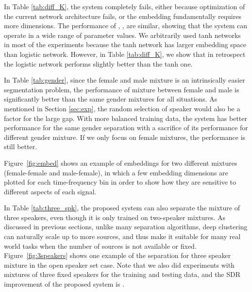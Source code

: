 \documentclass[9pt]{article} \usepackage{nips15submit_e,times}
\begin{document}
In Table \ref{tab:diff_K}, the  system completely fails, either because optimization of the current network architecture fails, or the embedding fundamentally requires more dimensions. The performance of , ,  are similar, showing that the system can operate in a wide range of parameter values.  
We arbitrarily used tanh networks in most of the experiments because the tanh network has larger embedding space than logistic network. However, in Table \ref{tab:diff_K}, we show that in retrospect the logistic network performs slightly better than the tanh one.  

In Table \ref{tab:gender}, since the female and male mixture is an intrinsically easier segmentation problem, the performance of mixture between female and male is significantly better than the same gender mixtures for all situations. As mentioned in Section \ref{sec:exp}, the random selection of speaker would also be a factor for the large gap. With more balanced training data, the system has better performance for the same gender separation with a sacrifice of its performance for different gender mixture. If we only focus on female mixtures, the performance is still better.  

Figure~\ref{fig:embed} shows an example of embeddings for two different mixtures (female-female and male-female), in which a few embedding dimensions are plotted for each time-frequency bin in order to show how they are sensitive to different aspects of each signal. 

In Table \ref{tab:three_spk}, the proposed system can also separate the mixture of three speakers, even though it is only trained on two-speaker mixtures. As discussed in previous sections, unlike many separation algorithms, deep clustering can naturally scale up to more sources, and thus make it suitable for many real world tasks when the number of sources is not available or fixed. Figure~\ref{fig:3speakers} shows one example of the separation for three speaker mixture in the open speaker set case.
Note that we also did experiments with mixtures of three fixed speakers for the training and testing data, and the SDR improvement of the proposed system is .    
\end{document}
